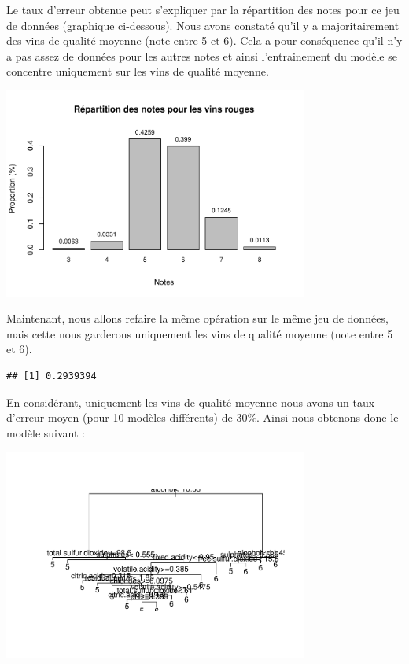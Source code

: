 \documentclass[
]{article}
\begin{document}
Le taux d'erreur obtenue peut s'expliquer par la répartition des notes
pour ce jeu de données (graphique ci-dessous). Nous avons constaté qu'il
y a majoritairement des vins de qualité moyenne (note entre 5 et 6).
Cela a pour conséquence qu'il n'y a pas assez de données pour les autres
notes et ainsi l'entrainement du modèle se concentre uniquement sur les
vins de qualité moyenne.

\begin{center}
	\includegraphics[width=10cm]{repport_files/figure-latex/unnamed-chunk-23-1.pdf}
\end{center}
Maintenant, nous allons refaire la même opération sur le même jeu de
données, mais cette nous garderons uniquement les vins de qualité
moyenne (note entre 5 et 6).

\begin{verbatim}
## [1] 0.2939394
\end{verbatim}

En considérant, uniquement les vins de qualité moyenne nous avons un
taux d'erreur moyen (pour 10 modèles différents) de 30\%. Ainsi nous
obtenons donc le modèle suivant :

\begin{center}
	\includegraphics[width=10cm]{repport_files/figure-latex/unnamed-chunk-25-1.pdf}
\end{center}
\end{document}

